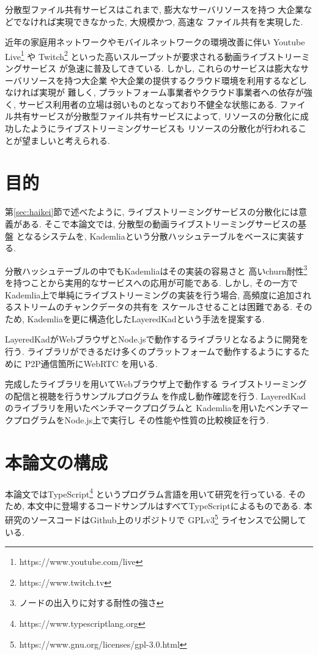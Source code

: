 \documentclass[sotsuron]{jcsie}
\begin{document}
分散型ファイル共有サービスはこれまで, 膨大なサーバリソースを持つ
大企業などでなければ実現できなかった, 大規模かつ, 高速な
ファイル共有を実現した.

近年の家庭用ネットワークやモバイルネットワークの環境改善に伴い
Youtube Live\footnote{https://www.youtube.com/live} や 
Twitch\footnote{https://www.twitch.tv} 
といった高いスループットが要求される動画ライブストリーミングサービス
が急速に普及してきている.
しかし, これらのサービスは膨大なサーバリソースを持つ大企業
や大企業の提供するクラウド環境を利用するなどしなければ実現が
難しく,  プラットフォーム事業者やクラウド事業者への依存が強く, 
サービス利用者の立場は弱いものとなっており不健全な状態にある.
ファイル共有サービスが分散型ファイル共有サービスによって, 
リソースの分散化に成功したようにライブストリーミングサービスも
リソースの分散化が行われることが望ましいと考えられる.

\section{目的}
第\ref{sec:haikei}節で述べたように, 
ライブストリーミングサービスの分散化には意義がある.
そこで本論文では, 分散型の動画ライブストリーミングサービスの基盤
となるシステムを, Kademliaという分散ハッシュテーブルをベースに実装する.

分散ハッシュテーブルの中でもKademliaはその実装の容易さと
高いchurn耐性\footnote{ノードの出入りに対する耐性の強さ}
を持つことから実用的なサービスへの応用が可能である.
しかし, その一方でKademlia上で単純にライブストリーミングの実装を行う場合, 
高頻度に追加されるストリームのチャンクデータの共有を
スケールさせることは困難である.
そのため, Kademliaを更に構造化したLayeredKadという手法を提案する.

LayeredKadがWebブラウザとNode.jsで動作するライブラリとなるように開発を行う.
ライブラリができるだけ多くのプラットフォームで動作するようにするために
P2P通信箇所にWebRTC \cite{WebRTCHo80:online}を用いる.

完成したライブラリを用いてWebブラウザ上で動作する
ライブストリーミングの配信と視聴を行うサンプルプログラム
を作成し動作確認を行う.
LayeredKadのライブラリを用いたベンチマークプログラムと
Kademliaを用いたベンチマークプログラムをNode.js上で実行し
その性能や性質の比較検証を行う.

\section{本論文の構成}
本論文ではTypeScript\footnote{https://www.typescriptlang.org}
というプログラム言語を用いて研究を行っている.
そのため, 本文中に登場するコードサンプルはすべてTypeScriptによるものである.
本研究のソースコードはGithub上のリポジトリ\cite{shinyosh38:online}で
GPLv3\footnote{https://www.gnu.org/licenses/gpl-3.0.html}
ライセンスで公開している.
\end{document}
